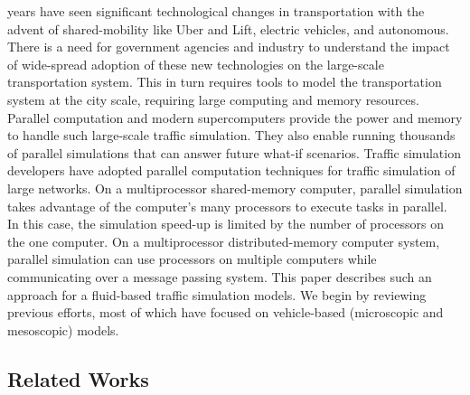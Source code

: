  years have seen significant technological changes in transportation with the advent of shared-mobility like Uber and Lift, electric vehicles, and autonomous. There is a need for government agencies and industry to understand the impact of wide-spread adoption of these new technologies on the large-scale transportation system. This in turn requires tools to model the transportation system at the city scale, requiring large computing and memory resources. Parallel computation and modern supercomputers provide the power and memory to handle such large-scale traffic simulation. They also enable running thousands of parallel simulations that can answer future what-if scenarios.
Traffic simulation developers have adopted parallel computation techniques for traffic simulation of large networks. On a multiprocessor shared-memory computer, parallel simulation takes advantage of the computer's many processors to execute tasks in parallel. In this case, the simulation speed-up is limited by the number of processors on the one computer. On a multiprocessor distributed-memory computer system, parallel simulation can use processors on multiple computers while communicating over a message passing system. This paper describes such an approach for a fluid-based traffic simulation models. We begin by reviewing previous efforts, most of which have focused on vehicle-based (microscopic and mesoscopic) models. 


\subsection{Related Works}

